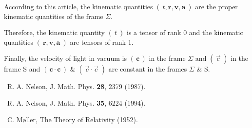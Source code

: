 \documentclass[10pt,fleqn]{article}
\begin{document}
\par \vspace{+1.35em}
\noindent According to this article, the kinematic quantities $( \: t , \mathbf{r}, \mathbf{v}, \mathbf{a} \: )$ are the proper kinematic quantities of the frame $\Sigma$.
\par \medskip \smallskip
\noindent Therefore, the kinematic quantity $( \: t \: )$ is a tensor of rank 0 and the kinematic quantities $( \: \mathbf{r}, \mathbf{v}, \mathbf{a} \: )$ are tensors of rank 1.
\par \medskip \smallskip
\noindent Finally, the velocity of light in vacuum is $( \, \mathbf{c} \, )$ in the frame $\Sigma$ and $( \, \vec{c} \; )$ in the frame S and $( \, \mathbf{c} \cdot \mathbf{c} \, )$ {\small \&} $( \, \vec{c} \cdot \vec{c} \; )$ are constant in the frames $\Sigma$ {\small \&} S.

\vspace{+0.90em}

\par {}

\bigskip \medskip

\par \noindent [1] \, R. A. Nelson, J. Math. Phys. {\bf 28}, 2379 (1987).
\medskip \medskip
\par \noindent [2] \, R. A. Nelson, J. Math. Phys. {\bf 35}, 6224 (1994).
\medskip \medskip
\par \noindent [3] \, C. M{\o}ller, The Theory of Relativity (1952).
\end{document}
